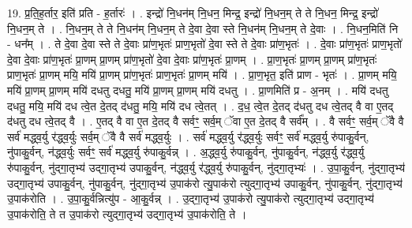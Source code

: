 \documentclass[17pt]{extarticle}
\begin{document}
19. प्र॒ति॒ह॒र्तार॒ इति॑ प्रति - ह॒र्तारः॑ । . इन्द्रो॑ नि॒धन॑म् नि॒धन॒ मिन्द्र॒ इन्द्रो॑ नि॒धन॒म् ते ते नि॒धन॒ मिन्द्र॒ इन्द्रो॑ नि॒धन॒म् ते । . नि॒धन॒म् ते ते नि॒धन॑म् नि॒धन॒म् ते दे॒वा दे॒वा स्ते नि॒धन॑म् नि॒धन॒म् ते दे॒वाः । . नि॒धन॒मिति॑ नि - धन᳚म् । . ते दे॒वा दे॒वा स्ते ते दे॒वाः प्रा॑ण॒भृतः॑ प्राण॒भृतो॑ दे॒वा स्ते ते दे॒वाः प्रा॑ण॒भृतः॑ । . दे॒वाः प्रा॑ण॒भृतः॑ प्राण॒भृतो॑ दे॒वा दे॒वाः प्रा॑ण॒भृतः॑ प्रा॒णम् प्रा॒णम् प्रा॑ण॒भृतो॑ दे॒वा दे॒वाः प्रा॑ण॒भृतः॑ प्रा॒णम् । . प्रा॒ण॒भृतः॑ प्रा॒णम् प्रा॒णम् प्रा॑ण॒भृतः॑ प्राण॒भृतः॑ प्रा॒णम् मयि॒ मयि॑ प्रा॒णम् प्रा॑ण॒भृतः॑ प्राण॒भृतः॑ प्रा॒णम् मयि॑ । . प्रा॒ण॒भृत॒ इति॑ प्राण - भृतः॑ । . प्रा॒णम् मयि॒ मयि॑ प्रा॒णम् प्रा॒णम् मयि॑ दधतु दधतु॒ मयि॑ प्रा॒णम् प्रा॒णम् मयि॑ दधतु । . प्रा॒णमिति॑ प्र - अ॒नम् । . मयि॑ दधतु दधतु॒ मयि॒ मयि॑ दध त्वे॒त दे॒तद् द॑धतु॒ मयि॒ मयि॑ दध त्वे॒तत् । . द॒ध॒ त्वे॒त दे॒तद् द॑धतु दध त्वे॒तद् वै वा ए॒तद् द॑धतु दध त्वे॒तद् वै । . ए॒तद् वै वा ए॒त दे॒तद् वै सर्वꣳ॒॒ सर्व॒म् ॅवा ए॒त दे॒तद् वै सर्व᳚म् । . वै सर्वꣳ॒॒ सर्व॒म् ॅवै वै सर्व॑ मद्ध्व॒र्यु र॑द्ध्व॒र्युः सर्व॒म् ॅवै वै सर्व॑ मद्ध्व॒र्युः । . सर्व॑ मद्ध्व॒र्यु र॑द्ध्व॒र्युः सर्वꣳ॒॒ सर्व॑ मद्ध्व॒र्यु रु॑पाकु॒र्वन्, नु॑पाकु॒र्वन्, न॑द्ध्व॒र्युः सर्वꣳ॒॒ सर्व॑ मद्ध्व॒र्यु रु॑पाकु॒र्वन्न् । . अ॒द्ध्व॒र्यु रु॑पाकु॒र्वन्, नु॑पाकु॒र्वन्, न॑द्ध्व॒र्यु र॑द्ध्व॒र्यु रु॑पाकु॒र्वन्, नु॑द्‍गा॒तृभ्य॑ उद्‍गा॒तृभ्य॑ उपाकु॒र्वन्, न॑द्ध्व॒र्यु र॑द्ध्व॒र्यु रु॑पाकु॒र्वन्, नु॑द्‍गा॒तृभ्यः॑ । . उ॒पा॒कु॒र्वन्, नु॑द्‍गा॒तृभ्य॑ उद्‍गा॒तृभ्य॑ उपाकु॒र्वन्, नु॑पाकु॒र्वन्, नु॑द्‍गा॒तृभ्य॑ उ॒पाक॑रो त्यु॒पाक॑रो त्युद्‍गा॒तृभ्य॑ उपाकु॒र्वन्, नु॑पाकु॒र्वन्, नु॑द्‍गा॒तृभ्य॑ उ॒पाक॑रोति । . उ॒पा॒कु॒र्वन्नित्यु॑प - आ॒कु॒र्वन्न् । . उ॒द्‍गा॒तृभ्य॑ उ॒पाक॑रो त्यु॒पाक॑रो त्युद्‍गा॒तृभ्य॑ उद्‍गा॒तृभ्य॑ उ॒पाक॑रोति॒ ते त उ॒पाक॑रो त्युद्‍गा॒तृभ्य॑ उद्‍गा॒तृभ्य॑ उ॒पाक॑रोति॒ ते । \newline
\end{document}
